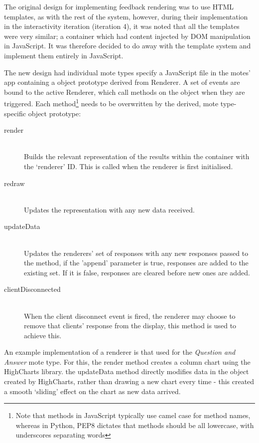 \documentclass[a4papert,11pt,notitlepage]{article}
\begin{document}
The original design for implementing feedback rendering was to use HTML templates, as with the rest of the system, however, during their implementation in the interactivity iteration (iteration 4), it was noted that all the templates were very similar; a container which had content injected by DOM manipulation\cite{dommanipulation:web} in JavaScript. It was therefore decided to do away with the template system and implement them entirely in JavaScript.

The new design had individual mote types specify a JavaScript file in the motes' app containing a object prototype derived from Renderer. A set of events are bound to the active Renderer, which call methods on the object when they are triggered. Each method\footnote{Note that methods in JavaScript typically use camel case for method names, whereas in Python, PEP8 dictates that methods should be all lowercase, with underscores separating words} needs to be overwritten by the derived, mote type-specific object prototype:
\begin{description}
\item[render] \hfill \\
Builds the relevant representation of the results within the container with the `renderer' ID. This is called when the renderer is first initialised.
\item[redraw] \hfill \\
Updates the representation with any new data received.
\item[updateData] \hfill \\
Updates the renderers' set of responses with any new responses passed to the method, if the 'append' parameter is true, responses are added to the existing set. If it is false, responses are cleared before new ones are added.
\item[clientDisconnected] \hfill \\
When the client disconnect event is fired, the renderer may choose to remove that clients' response from the display, this method is used to achieve this.
\end{description}

An example implementation of a renderer is that used for the \emph{Question and Answer} mote type. For this, the render method creates a column chart using the HighCharts\cite{highcharts:web} library. the updateData method directly modifies data in the object created by HighCharts, rather than drawing a new chart every time - this created a smooth `sliding' effect on the chart as new data arrived.
\end{document}

